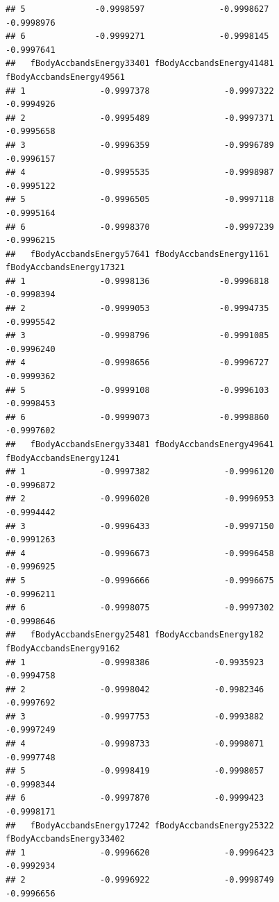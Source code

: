 \documentclass[
]{article}
\begin{document}
\begin{verbatim}
## 5              -0.9998597               -0.9998627               -0.9998976
## 6              -0.9999271               -0.9998145               -0.9997641
##   fBodyAccbandsEnergy33401 fBodyAccbandsEnergy41481 fBodyAccbandsEnergy49561
## 1               -0.9997378               -0.9997322               -0.9994926
## 2               -0.9995489               -0.9997371               -0.9995658
## 3               -0.9996359               -0.9996789               -0.9996157
## 4               -0.9995535               -0.9998987               -0.9995122
## 5               -0.9996505               -0.9997118               -0.9995164
## 6               -0.9998370               -0.9997239               -0.9996215
##   fBodyAccbandsEnergy57641 fBodyAccbandsEnergy1161 fBodyAccbandsEnergy17321
## 1               -0.9998136              -0.9996818               -0.9998394
## 2               -0.9999053              -0.9994735               -0.9995542
## 3               -0.9998796              -0.9991085               -0.9996240
## 4               -0.9998656              -0.9996727               -0.9999362
## 5               -0.9999108              -0.9996103               -0.9998453
## 6               -0.9999073              -0.9998860               -0.9997602
##   fBodyAccbandsEnergy33481 fBodyAccbandsEnergy49641 fBodyAccbandsEnergy1241
## 1               -0.9997382               -0.9996120              -0.9996872
## 2               -0.9996020               -0.9996953              -0.9994442
## 3               -0.9996433               -0.9997150              -0.9991263
## 4               -0.9996673               -0.9996458              -0.9996925
## 5               -0.9996666               -0.9996675              -0.9996211
## 6               -0.9998075               -0.9997302              -0.9998646
##   fBodyAccbandsEnergy25481 fBodyAccbandsEnergy182 fBodyAccbandsEnergy9162
## 1               -0.9998386             -0.9935923              -0.9994758
## 2               -0.9998042             -0.9982346              -0.9997692
## 3               -0.9997753             -0.9993882              -0.9997249
## 4               -0.9998733             -0.9998071              -0.9997748
## 5               -0.9998419             -0.9998057              -0.9998344
## 6               -0.9997870             -0.9999423              -0.9998171
##   fBodyAccbandsEnergy17242 fBodyAccbandsEnergy25322 fBodyAccbandsEnergy33402
## 1               -0.9996620               -0.9996423               -0.9992934
## 2               -0.9996922               -0.9998749               -0.9996656

\end{verbatim}
\end{document}
